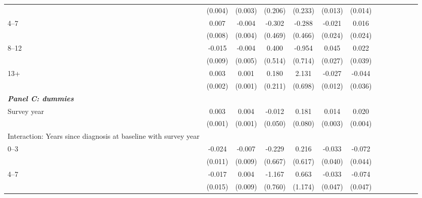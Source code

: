 \documentclass[12pt,english]{article}
\begin{document}
\begin{table}[p]
\begin{center}
\begin{adjustbox}{max width=.9\linewidth}
\begin{threeparttable}
{\begin{tabular}{l*{6}{S S}}
						&  (0.004)         &  (0.003)         &  (0.206)         &  (0.233)         &  (0.013)         &  (0.014)         \\
						\hspace*{10mm}4--7 &   0.007         &   -0.004         &   -0.302         &   -0.288         &   -0.021         &    0.016         \\
						&  (0.008)         &  (0.004)         &  (0.469)         &  (0.466)         &  (0.024)         &  (0.024)         \\
						\hspace*{10mm}8--12 &   -0.015\sym{*}  &   -0.004         &    0.400         &   -0.954         &    0.045\sym{*}  &    0.022         \\
						&  (0.009)         &  (0.005)         &  (0.514)         &  (0.714)         &  (0.027)         &  (0.039)         \\
						\hspace*{10mm}13+ &   0.003         &    0.001         &    0.180         &    2.131\sym{***}&   -0.027\sym{**} &   -0.044         \\
						&  (0.002)         &  (0.001)         &  (0.211)         &  (0.698)         &  (0.012)         &  (0.036)         \\
						\textit{\textbf{Panel C: dummies}} &&&&&&\\
						Survey year     &    0.003\sym{***}&    0.004\sym{***}&   -0.012         &    0.181\sym{**} &    0.014\sym{***}&    0.020\sym{***}\\
						&  (0.001)         &  (0.001)         &  (0.050)         &  (0.080)         &  (0.003)         &  (0.004)         \\
						Interaction: Years since diagnosis at baseline with survey year &&&&&&\\
						\hspace*{10mm}0--3&   -0.024\sym{**} &   -0.007         &   -0.229         &    0.216         &   -0.033         &   -0.072         \\
						&  (0.011)         &  (0.009)         &  (0.667)         &  (0.617)         &  (0.040)         &  (0.044)         \\
						\hspace*{10mm}4--7 &   -0.017         &    0.004         &   -1.167         &    0.663         &   -0.033         &   -0.074         \\
						&  (0.015)         &  (0.009)         &  (0.760)         &  (1.174)         &  (0.047)         &  (0.047)         \\

\end{tabular}}
\end{threeparttable}
\end{adjustbox}
\end{center}
\end{table}
\end{document}
